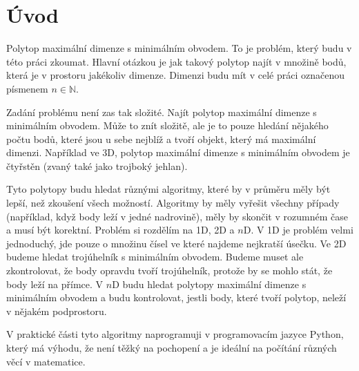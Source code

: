 \chapter*{Úvod}

Polytop maximální dimenze s minimálním obvodem. To je problém, který budu v této práci zkoumat. Hlavní otázkou je jak takový polytop najít v množině bodů, která je v prostoru jakékoliv dimenze. Dimenzi budu mít v celé práci označenou písmenem $n \in \mathbb{N}$.

Zadání problému není zas tak složité. Najít polytop maximální dimenze s minimálním obvodem. Může to znít složitě, ale je to pouze hledání nějakého počtu bodů, které jsou u sebe nejblíž a tvoří objekt, který má maximální dimenzi. Například ve 3D, polytop maximální dimenze s minimálním obvodem je čtyřstěn (zvaný také jako trojboký jehlan). 

Tyto polytopy budu hledat různými algoritmy, které by v průměru měly být lepší, než zkoušení všech možností. Algoritmy by měly vyřešit všechny případy (například, když body leží v jedné nadrovině), měly by skončit v rozumném čase a musí být korektní. Problém si rozdělím na 1D, 2D a $n$D. V 1D je problém velmi jednoduchý, jde pouze o množinu čísel ve které najdeme nejkratší úsečku. Ve 2D budeme hledat trojúhelník s minimálním obvodem. Budeme muset ale zkontrolovat, že body opravdu tvoří trojúhelník, protože by se mohlo stát, že body leží na přímce. V $n$D budu hledat polytopy maximální dimenze s minimálním obvodem a budu kontrolovat, jestli body, které tvoří polytop, neleží v nějakém podprostoru. 

V praktické části tyto algoritmy naprogramuji v programovacím jazyce Python, který má výhodu, že není těžký na pochopení a je ideální na počítání různých věcí v matematice. 